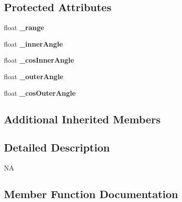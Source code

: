 \subsection*{Protected Attributes}
\begin{DoxyCompactItemize}
\item 
\mbox{\label{classSpotLight_accb79733906922492499a869c71face2}} 
float {\bfseries \+\_\+range}
\item 
\mbox{\label{classSpotLight_a6600af895d6bd418c8ac4e820a8ea8c0}} 
float {\bfseries \+\_\+inner\+Angle}
\item 
\mbox{\label{classSpotLight_abdb077c844b3ffc9fc4922fe208a2b3d}} 
float {\bfseries \+\_\+cos\+Inner\+Angle}
\item 
\mbox{\label{classSpotLight_a566e80b1fb58f919e36a8eb6a1b3c397}} 
float {\bfseries \+\_\+outer\+Angle}
\item 
\mbox{\label{classSpotLight_a3d5bd44a718b40a66e5db343bcd3cddf}} 
float {\bfseries \+\_\+cos\+Outer\+Angle}
\end{DoxyCompactItemize}
\subsection*{Additional Inherited Members}


\subsection{Detailed Description}
NA 

\subsection{Member Function Documentation}
\mbox{\label{classSpotLight_a147f2e56dd57473d8b51c07a5773d0f1}} 
